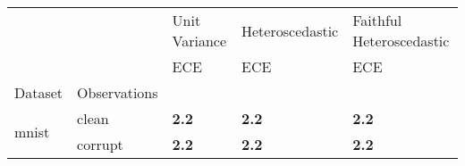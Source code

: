 \begin{tabular}{ll|l|l|l}
\toprule
 &  & Unit Variance & Heteroscedastic & Faithful Heteroscedastic \\
 &  & ECE & ECE & ECE \\
Dataset & Observations &  &  &  \\
\midrule
\multirow[c]{2}{*}{mnist} & clean & \bfseries 2.2 & \bfseries 2.2 & \bfseries 2.2 \\
 & corrupt & \bfseries 2.2 & \bfseries 2.2 & \bfseries 2.2 \\
\bottomrule
\end{tabular}
